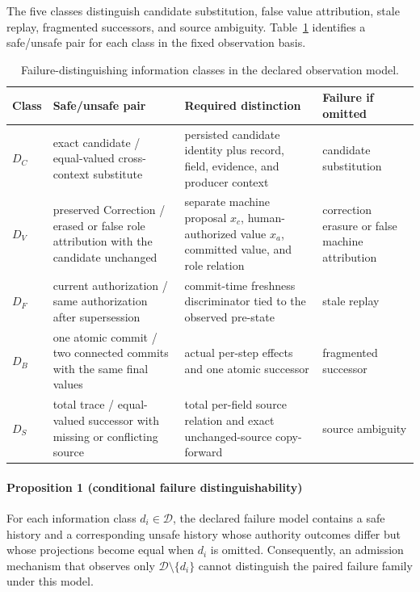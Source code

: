 The five classes distinguish candidate substitution, false value attribution, stale replay, fragmented successors, and source ambiguity. Table~\ref{tab:distinctions} identifies a safe/unsafe pair for each class in the fixed observation basis.

\begin{table}[!htbp]
\centering
\footnotesize
\caption{Failure-distinguishing information classes in the declared observation model.}
\label{tab:distinctions}
\begin{tabularx}{\textwidth}{@{}l>{\raggedright\arraybackslash}p{}>{\raggedright\arraybackslash}p{}>{\raggedright\arraybackslash}X@{}}
\toprule
Class & Safe/unsafe pair & Required distinction & Failure if omitted \\
\midrule
$D_C$ & exact candidate / equal-valued cross-context substitute & persisted candidate identity plus record, field, evidence, and producer context & candidate substitution \\
$D_V$ & preserved Correction / erased or false role attribution with the candidate unchanged & separate machine proposal $x_c$, human-authorized value $x_a$, committed value, and role relation & correction erasure or false machine attribution \\
$D_F$ & current authorization / same authorization after supersession & commit-time freshness discriminator tied to the observed pre-state & stale replay \\
$D_B$ & one atomic commit / two connected commits with the same final values & actual per-step effects and one atomic successor & fragmented successor \\
$D_S$ & total trace / equal-valued successor with missing or conflicting source & total per-field source relation and exact unchanged-source copy-forward & source ambiguity \\
\bottomrule
\end{tabularx}
\end{table}

\paragraph{Proposition 1 (conditional failure distinguishability)}
For each information class $d_i\in\mathcal D$, the declared failure model contains a safe history and a corresponding unsafe history whose authority outcomes differ but whose projections become equal when $d_i$ is omitted. Consequently, an admission mechanism that observes only $\mathcal D\setminus\{d_i\}$ cannot distinguish the paired failure family under this model.

